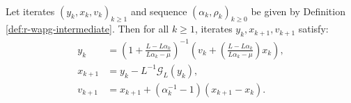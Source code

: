 \documentclass[12pt]{article}
\begin{document}
        \begin{proposition}\label{prop:wagp-st-form}\;\\
            Let iterates $(y_k, x_{k}, v_{k})_{k \ge 1}$ and sequence $(\alpha_k, \rho_k)_{k \ge 0}$ be given by Definition \ref{def:r-wapg-intermediate}.
            Then for all $k \ge 1$, iterates $y_k, x_{k + 1}, v_{k + 1}$
            satisfy:
            \begin{align}
                y_{k} &=
                \left(
                    1 + \frac{L - L\alpha_{k}}{L\alpha_{k} - \mu}
                \right)^{-1}
                \left(
                    v_{k} +
                    \left(\frac{L - L\alpha_{k}}{L\alpha_{k} - \mu} \right) x_{k}
                \right),
                \label{eqn:rwapg-st-form-eqn-1}
                \\
                x_{k + 1} &=
                y_k - L^{-1} \mathcal G_L (y_k),
                \\
                v_{k + 1} &= x_{k + 1} + (\alpha_k^{-1} - 1)(x_{k + 1} - x_k).
                \label{eqn:rwapg-st-form-eqn-3}
            \end{align}
        \end{proposition}
\end{document}
